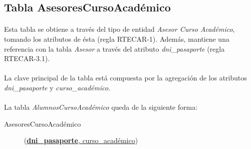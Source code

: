    \subsection{Tabla AsesoresCursoAcadémico}

      \paragraph{}Esta tabla se obtiene a través del tipo de entidad
      \textit{Asesor Curso Académico}, tomando los atributos de ésta (regla
      RTECAR-1). Además, mantiene una referencia con la tabla \textit{Asesor} a
      través del atributo \textit{dni\_pasaporte} (regla RTECAR-3.1).

      \paragraph{}La clave principal de la tabla está compuesta por la
      agregación de los atributos \textit{dni\_pasaporte} y
      \textit{curso\_académico}.

      \paragraph{}La tabla \textit{AlumnosCursoAcadémico} queda de la siguiente
      forma:

      \begin{description}
         \item[AsesoresCursoAcadémico] \begin{flushleft}(\underline{\textbf{dni\_pasaporte},
         curso\_académico})\end{flushleft}
      \end{description}
